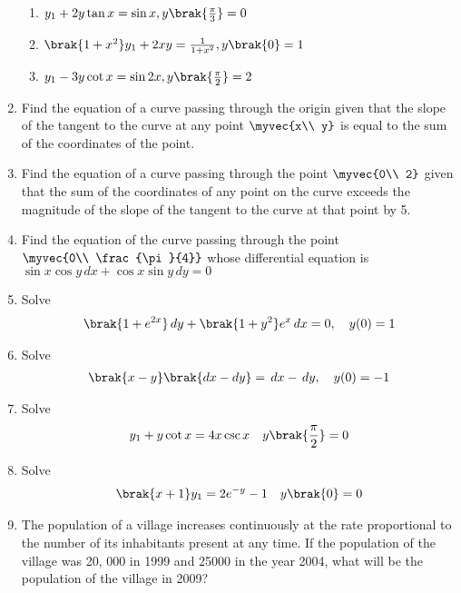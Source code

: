 \begin{enumerate}[label=\arabic*.,ref=\thesubsection.\theenumi]
\begin{enumerate}[label=(\roman*)]
%
\item  $y_1 + 2y\tan x = \sin x, y\brak{\frac{\pi}{3}} = 0$
\item  $\brak{1+x^2}y_1 + 2xy = \frac{1}{1+x^2}, y\brak{0} = 1$
\item  $y_1 - 3y\cot x = \sin 2x, y\brak{\frac{\pi}{2}} = 2$
\end{enumerate}
\item Find the equation of a curve passing through the origin given that the slope of the tangent to the curve at any point $\myvec{x\\ y}$ is equal to the sum of the coordinates of the point.
\item  Find the equation of a curve passing through the point $\myvec{0\\ 2}$ given that the sum of the coordinates of any point on the curve exceeds the magnitude of the slope of the tangent to the curve at that point by 5.
%
\item Find the equation of the curve passing through the point $\myvec{0\\ \frac{\pi}{4}}$ whose differential equation is $\sin x \cos y \, dx + \cos x \sin y \, dy = 0$
%
\item Solve 
%
\begin{align}
\brak{1+e^{2x}}\, dy +\brak{1+y^2}e^{x} \, dx = 0, \quad y(0) = 1
\end{align}
%
\item Solve
%
\begin{align}
\brak{x-y}\brak{dx-dy}  = \, dx - \, dy, \quad y(0) = -1
\end{align}
%
\item Solve
%
\begin{align}
y_1 + y\cot x = 4x\csc x \quad y\brak{\frac{\pi}{2}} = 0
\end{align}
%
\item Solve
%
\begin{align}
\brak{x+1}y_1  = 2e^{-y} - 1 \quad y\brak{0} = 0
\end{align}
%
\item The population of a village increases continuously at the rate proportional to the number of its inhabitants present at any time. If the population of the village was 20, 000 in 1999 and 25000 in the year 2004, what will be the population of the village in 2009?

\end{enumerate}
